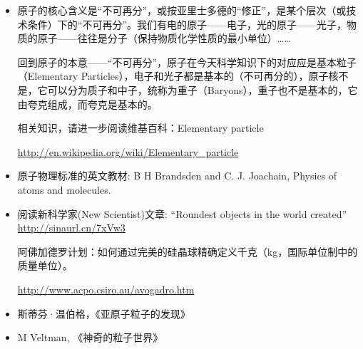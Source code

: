 \begin{itemize}

  \item 原子的核心含义是“不可再分”，或按亚里士多德的“修正”，是某个层次（或技术条件）下的“不可再分”。我们有电的原子——电子，光的原子——光子，物质的原子——往往是分子（保持物质化学性质的最小单位）……

回到原子的本意——“不可再分”，原子在今天科学知识下的对应应是基本粒子（Elementary Particles），电子和光子都是基本的（不可再分的），原子核不是，它可以分为质子和中子，统称为重子（Baryons），重子也不是基本的，它由夸克组成，而夸克是基本的。

相关知识，请进一步阅读维基百科：Elementary particle

\url{http://en.wikipedia.org/wiki/Elementary_particle}

\item 原子物理标准的英文教材: B H Brandsden and C. J. Joachain, Physics of atoms and
  molecules. 
  
\item 阅读新科学家(New Scientist)文章: ``Roundest objects in the world
created'' \url{http://sinaurl.cn/7xVw3}

阿佛加德罗计划：如何通过完美的硅晶球精确定义千克（kg，国际单位制中的质量单位）。

\url{http://www.acpo.csiro.au/avogadro.htm}

\item 斯蒂芬·温伯格，《亚原子粒子的发现》
  
\item M Veltman, 《神奇的粒子世界》
  
\end{itemize}
